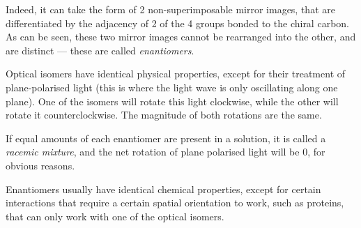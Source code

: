 
		Indeed, it can take the form of 2 non-superimposable mirror images, that are differentiated by the adjacency of 2 of
		the 4 groups bonded to the chiral carbon. As can be seen, these two mirror images cannot be rearranged into the other,
		and are distinct –– these are called \textit{enantiomers}.



		Optical isomers have identical physical properties, except for their treatment of plane-polarised light (this is
		where the light wave is only oscillating along one plane). One of the isomers will rotate this light clockwise, while the
		other will rotate it counterclockwise. The magnitude of both rotations are the same.

		If equal amounts of each enantiomer are present in a solution, it is called a \textit{racemic mixture}, and the net
		rotation of plane polarised light will be 0, for obvious reasons.

		Enantiomers usually have identical chemical properties, except for certain interactions that require a certain spatial
		orientation to work, such as proteins, that can only work with one of the optical isomers.




















